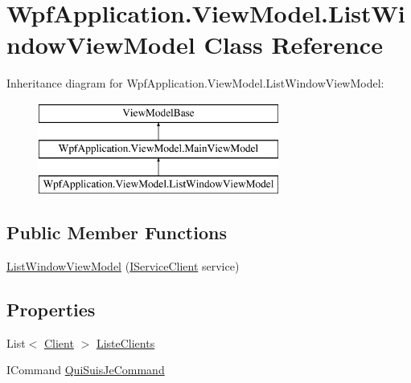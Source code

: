 \hypertarget{class_wpf_application_1_1_view_model_1_1_list_window_view_model}{\section{Wpf\-Application.\-View\-Model.\-List\-Window\-View\-Model Class Reference}
\label{class_wpf_application_1_1_view_model_1_1_list_window_view_model}
}
Inheritance diagram for Wpf\-Application.\-View\-Model.\-List\-Window\-View\-Model\-:\begin{figure}[H]
\begin{center}
\leavevmode
\includegraphics[height=3.000000cm]{class_wpf_application_1_1_view_model_1_1_list_window_view_model}
\end{center}
\end{figure}
\subsection*{Public Member Functions}
\begin{DoxyCompactItemize}
\item 
\hyperlink{class_wpf_application_1_1_view_model_1_1_list_window_view_model_a9eebaa1b58b8eee31763254332b733e1}{List\-Window\-View\-Model} (\hyperlink{interface_wpf_application_1_1_model_1_1_i_service_client}{I\-Service\-Client} service)
\end{DoxyCompactItemize}
\subsection*{Properties}
\begin{DoxyCompactItemize}
\item 
List$<$ \hyperlink{class_wpf_application_1_1_model_1_1_client}{Client} $>$ \hyperlink{class_wpf_application_1_1_view_model_1_1_list_window_view_model_a971a86a9000bf6c012967e817f59a2c4}{Liste\-Clients}
\item 
I\-Command \hyperlink{class_wpf_application_1_1_view_model_1_1_list_window_view_model_a08034eb12e314399e69dbf09850fc1fc}{Qui\-Suis\-Je\-Command}
\end{DoxyCompactItemize}


